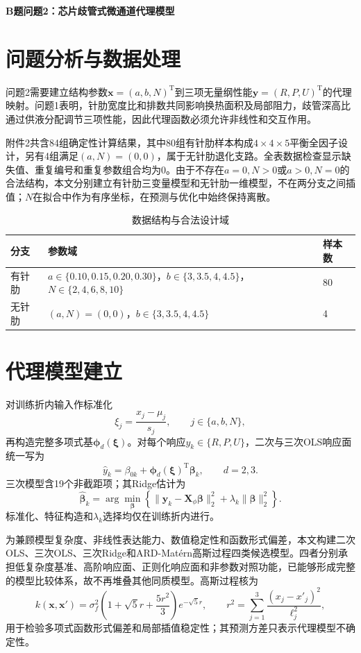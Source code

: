 \documentclass[UTF8,12pt,a4paper]{ctexart}
\begin{document}
\begin{center}
{\LARGE\bfseries\color{navy} B题问题2：芯片歧管式微通道代理模型}
\end{center}

\section{问题分析与数据处理}
问题2需要建立结构参数$\bm x=(a,b,N)^{\mathrm T}$到三项无量纲性能$\bm y=(R,P,U)^{\mathrm T}$的代理映射。问题1表明，针肋宽度比和排数共同影响换热面积及局部阻力，歧管深高比通过供液分配调节三项性能，因此代理函数必须允许非线性和交互作用。

附件2共含84组确定性计算结果，其中80组有针肋样本构成$4\times4\times5$平衡全因子设计，另有4组满足$(a,N)=(0,0)$，属于无针肋退化支路。全表数据检查显示缺失值、重复编号和重复参数组合均为0。由于不存在$a=0,N>0$或$a>0,N=0$的合法结构，本文分别建立有针肋三变量模型和无针肋一维模型，不在两分支之间插值；$N$在拟合中作为有序坐标，在预测与优化中始终保持离散。

\begin{table}[H]\centering\small
\caption{数据结构与合法设计域}\label{tab:domain}
\begin{tabular}{lll}
\toprule
分支 & 参数域 & 样本数 \\
\midrule
有针肋 & $a\in\{0.10,0.15,0.20,0.30\}$，$b\in\{3,3.5,4,4.5\}$，$N\in\{2,4,6,8,10\}$ & 80 \\
无针肋 & $(a,N)=(0,0)$，$b\in\{3,3.5,4,4.5\}$ & 4 \\
\bottomrule
\end{tabular}
\end{table}

\section{代理模型建立}
对训练折内输入作标准化
\[
\xi_j=\frac{x_j-\mu_j}{s_j},\qquad j\in\{a,b,N\},
\]
再构造完整多项式基$\bm\phi_d(\bm\xi)$。对每个响应$y_k\in\{R,P,U\}$，二次与三次OLS响应面统一写为
\[
\widehat y_k=\beta_{0k}+\bm\phi_d(\bm\xi)^{\mathrm T}\bm\beta_k,\qquad d=2,3.
\]
三次模型含19个非截距项；其Ridge估计为
\[
\widehat{\bm\beta}_k=\arg\min_{\bm\beta}\left\{\|\bm y_k-\bm X_\phi\bm\beta\|_2^2+\lambda_k\|\bm\beta\|_2^2\right\}.
\]
标准化、特征构造和$\lambda_k$选择均仅在训练折内进行。

为兼顾模型复杂度、非线性表达能力、数值稳定性和函数形式偏差，本文构建二次OLS、三次OLS、三次Ridge和ARD-Matérn高斯过程四类候选模型。四者分别承担低复杂度基准、高阶响应面、正则化响应面和非参数对照功能，已能够形成完整的模型比较体系，故不再堆叠其他同质模型。高斯过程核为
\[
k(\bm x,\bm x')=\sigma_f^2\left(1+\sqrt5r+\frac{5r^2}{3}\right)e^{-\sqrt5r},\qquad
r^2=\sum_{j=1}^3\frac{(x_j-x'_j)^2}{\ell_j^2},
\]
用于检验多项式函数形式偏差和局部插值稳定性；其预测方差只表示代理模型不确定性。
\end{document}
